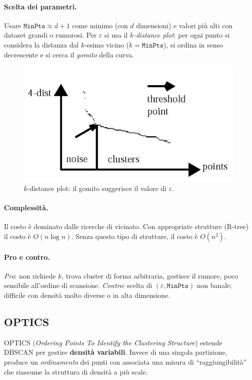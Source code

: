 \paragraph{Scelta dei parametri.}
Usare $\texttt{MinPts}\approx d{+}1$ come minimo (con $d$ dimensioni) e valori più alti con dataset grandi o rumorosi. Per $\varepsilon$ si usa il \emph{$k$-distance plot}: per ogni punto si considera la distanza dal $k$-esimo vicino ($k=\texttt{MinPts}$), si ordina in senso decrescente e si cerca il \emph{gomito} della curva.

\begin{figure}[htbp]
  \centering
  \includegraphics[width=.68\textwidth]{images/kdistance_plot.png}
  \caption{$k$-distance plot: il gomito suggerisce il valore di $\varepsilon$.}
  \label{fig:kdist}
\end{figure}

\paragraph{Complessità.}
Il costo è dominato dalle ricerche di vicinato. Con appropriate strutture (R-tree) il costo è $O(n\log n)$. Senza questo tipo di strutture, il costo è $O(n^2)$.
\paragraph{Pro e contro.}
\emph{Pro}: non richiede $k$, trova cluster di forma arbitraria, gestisce il rumore, poco sensibile all’ordine di scansione.  
\emph{Contro}: scelta di $(\varepsilon,\texttt{MinPts})$ non banale; difficile con densità molto diverse o in alta dimensione.


\subsection{OPTICS}\label{sec:optics}
OPTICS (\emph{Ordering Points To Identify the Clustering Structure}) estende DBSCAN per gestire \textbf{densità variabili}. Invece di una singola partizione, produce un \emph{ordinamento} dei punti con associata una misura di “raggiungibilità” che riassume la struttura di densità a più scale.

